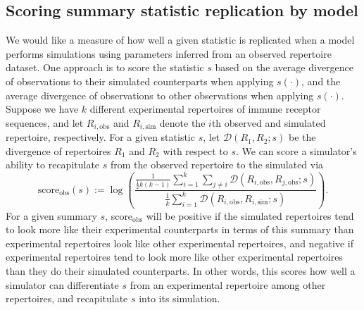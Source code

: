 \documentclass{article}
\begin{document}
\subsection*{Scoring summary statistic replication by model}
We would like a measure of how well a given statistic is replicated when a model performs simulations using parameters inferred from an observed repertoire dataset.
One approach is to score the statistic $s$ based on the average divergence of observations to their simulated counterparts when applying $s(\cdot)$, and the average divergence of observations to other observations when applying $s(\cdot)$.
Suppose we have $k$ different experimental repertoires of immune receptor sequences, and let $R_{i, \text{obs}}$ and $R_{i, \text{sim}}$ denote the $i$th observed and simulated repertoire, respectively.
For a given statistic $s$, let $\mathcal D(R_1, R_2; s)$ be the divergence of repertoires $R_1$ and $R_2$ with respect to $s$.
We can score a simulator's ability to recapitulate $s$ from the observed repertoire to the simulated via
\begin{equation}
    \text{score}_\text{obs}(s) := 
    \log \left( 
        \frac{ 
            \frac{1}{\frac{1}{2} k\left(k - 1\right)}
            \sum_{i=1}^{k}
            \sum_{j \ne i}
                \mathcal D\left(R_{i, \text{obs}}, R_{j, \text{obs}}; s\right) 
        }
        { 
            \frac{1}{k} 
            \sum_{i = 1}^k 
                \mathcal D \left( R_{i, \text{obs}}, R_{i, \text{sim}} ; s\right) 
        } 
    \right).
\end{equation}
For a given summary $s$, score$_\text{obs}$ will be positive if the simulated repertoires tend to look more like their experimental counterparts in terms of this summary than experimental repertoires look like other experimental repertoires, and negative if experimental repertoires tend to look more like other experimental repertoires than they do their simulated counterparts.
In other words, this scores how well a simulator can differentiate $s$ from an experimental repertoire among other repertoires, and recapitulate $s$ into its simulation.
\end{document}
